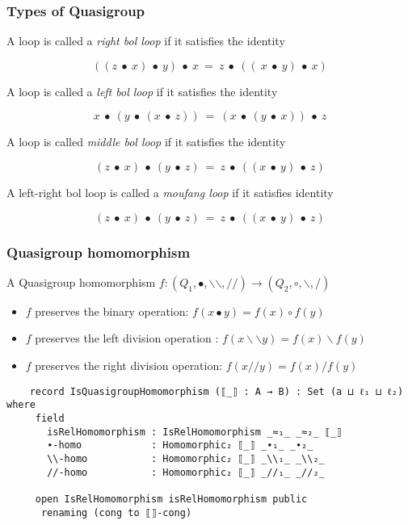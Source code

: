 \documentclass[xcolor={dvipsnames}]{beamer}
\begin{document}
\begin{frame}[fragile]
  \frametitle{Types of Quasigroup}

  A loop is called a \textit{right bol loop} if it satisfies the identity

   \[((z\ ∙\ x)\ ∙\ y)\ ∙\ x\ =\ z\ ∙\ ((\ x\ ∙\ y)\ ∙\ x)\]

  A loop is called a \textit{left bol loop} if it satisfies the identity

   \[x\ ∙\ (y\ ∙\ (x\ ∙\ z))\ =\ (x\ ∙\ (y\ ∙\ x))\ ∙\ z\]

  A loop is called \textit{middle bol loop} if it satisfies the identity

  \[(z\ ∙\ x)\ ∙\ (y\ ∙\ z)\ =\ z\ ∙\ ((x\ ∙\ y)\ ∙\ z)\]

  A left-right bol loop is called a \textit{moufang loop} if it satisfies identity

  \[(z\ ∙\ x)\ ∙\ (y\ ∙\ z)\ =\ z\ ∙\ ((x\ ∙\ y)\ ∙\ z)\]

\end{frame}

\begin{frame}[fragile]
  \frametitle{Quasigroup homomorphism}
    A Quasigroup homomorphism \( f:(Q_1,∙,\backslash \backslash,//) \rightarrow
    (Q_2,\circ,\backslash,/) \)
    \begin{itemize}
        \item $f$ preserves the binary operation: $f(x∙y) = f(x) \circ f(y)$
        \item $f$ preserves the left division operation : $f(x\backslash \backslash y) = f(x)\backslash f(y)$
        \item $f$ preserves the right division operation: $f(x//y) = f(x)/f(y)$
    \end{itemize}
\begin{verbatim}
    record IsQuasigroupHomomorphism (⟦_⟧ : A → B) : Set (a ⊔ ℓ₁ ⊔ ℓ₂) where
     field
       isRelHomomorphism : IsRelHomomorphism _≈₁_ _≈₂_ ⟦_⟧
       ∙-homo            : Homomorphic₂ ⟦_⟧ _∙₁_ _∙₂_
       \\-homo           : Homomorphic₂ ⟦_⟧ _\\₁_ _\\₂_
       //-homo           : Homomorphic₂ ⟦_⟧ _//₁_ _//₂_
  
     open IsRelHomomorphism isRelHomomorphism public
      renaming (cong to ⟦⟧-cong)
\end{verbatim}
\end{frame}
  
\end{document}
